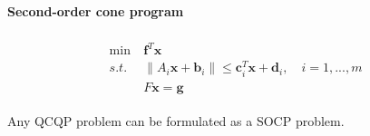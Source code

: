 \par
\paragraph{Second-order cone program}
\begin{align}
    \begin{array}{lll}
        \min \ & \mathbf{f}^T \mathbf{x} \\
        s.t. \ & \parallel A_i \mathbf{x} + \mathbf{b}_i \parallel
        \leq \mathbf{c}_i^T\mathbf{x} + \mathbf{d}_i, \quad i = 1,...,m \\
        & F\mathbf{x} = \mathbf{g}
    \end{array}
    \label{pro:socp1}
\end{align}

\begin{lemma}
    Any QCQP problem can be formulated as a SOCP problem.
\end{lemma}
